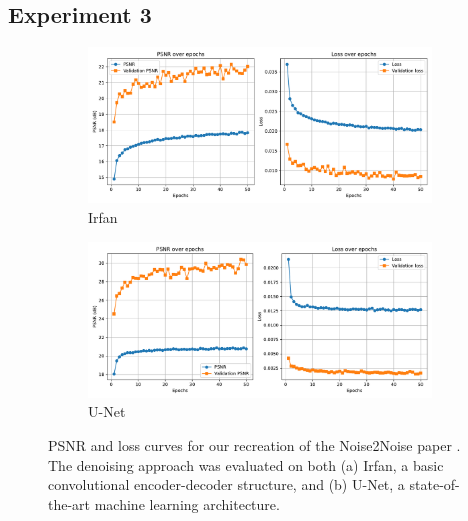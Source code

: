 \vfill

\newpage
\subsection{Experiment 3}
\vfill
\begin{figure}[htbp]
    \centering
    \begin{subfigure}{\textwidth}
        \centering
        \includegraphics[width=\textwidth]{img/ch6/n2n_imagenet/psnr_loss_irfan.pdf}
        \caption{Irfan}
        \label{fig:denoising-exp3-curves-irfan}
    \end{subfigure}
    
    \vspace{0.5cm}
    
    \begin{subfigure}{\textwidth}
        \centering
        \includegraphics[width=\textwidth]{img/ch6/n2n_imagenet/psnr_loss_unet.pdf}
        \caption{U-Net}
        \label{fig:denoising-exp3-curves-unet}
    \end{subfigure}
    \caption{PSNR and loss curves for our recreation of the Noise2Noise paper \cite{lehtinen_noise2noise_2018}. The denoising approach was evaluated on both (a) Irfan, a basic convolutional encoder-decoder structure, and (b) U-Net, a state-of-the-art machine learning architecture.}
    \label{fig:denoising-exp3-curves}
\end{figure}

\vfill




